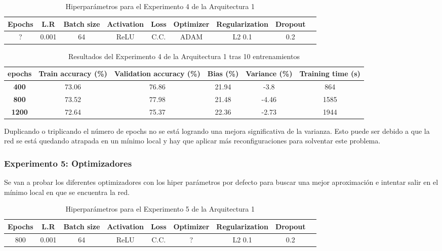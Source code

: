 \documentclass{article}
\begin{document}
        \begin{table}[!h]
				\begin{tabular}{|c|c|c|c|c|c|c|c|c|}
					\textbf{Epochs}&\textbf{L.R}&\textbf{Batch size}&\textbf{Activation}&\textbf{Loss}&\textbf{Optimizer}&\textbf{Regularization}&\textbf{Dropout}   \\ \hline
					? & 0.001 & 64 & ReLU & C.C. & ADAM & L2 0.1 & 0.2 
				\end{tabular}
				\caption{Hiperpar\'ametros para el Experimento 4 de la Arquitectura 1}
				\label{tab:hip-a6-e4}
			\end{table}

    
   
   \begin{table}[!h]
				\begin{center}
					\begin{tabular}{ c | c | c | c | c | c |}
						 \textbf{epochs} & \textbf{Train accuracy (\%)} & \textbf{Validation accuracy (\%)} & \textbf{Bias (\%)} & \textbf{Variance (\%)} & \textbf{Training time (s)} \\ \hline
						\textbf{400 } & 73.06   & 76.86 &  21.94 & -3.8 &864   \\ \hline
                        \textbf{800 } & 73.52   &77.98 &  21.48 & -4.46  &1585    \\ \hline
                        \textbf{1200} &  72.64  &75.37  &  22.36& -2.73 &1944    \\ \hline
					\end{tabular}
					\caption{Resultados del Experimento 4 de la Arquitectura 1 tras 10 entrenamientos}
					\label{tab:res-a2-e4}
				\end{center}
			\end{table}

Duplicando o triplicando el n\'umero de epochs no se est\'a logrando una mejora significativa de la varianza. Esto puede ser debido a que la red se est\'a quedando atrapada en un m\'inimo local y hay que aplicar más reconfiguraciones para solventar este problema. 

		\subsubsection{Experimento 5: Optimizadores}
Se van a probar los diferentes optimizadores con los hiper par\'ametros por defecto para buscar una mejor aproximaci\'on e intentar salir en el m\'inimo local en que se encuentra la red. 

 \begin{table}[!h]
				\begin{tabular}{|c|c|c|c|c|c|c|c|c|}
					\textbf{Epochs}&\textbf{L.R}&\textbf{Batch size}&\textbf{Activation}&\textbf{Loss}&\textbf{Optimizer}&\textbf{Regularization}&\textbf{Dropout}   \\ \hline
					800 & 0.001 & 64 & ReLU & C.C. & ? & L2 0.1 & 0.2 
				\end{tabular}
				\caption{Hiperpar\'ametros para el Experimento 5 de la Arquitectura 1}
				\label{tab:hip-a6-e5}
			\end{table}
\end{document}
